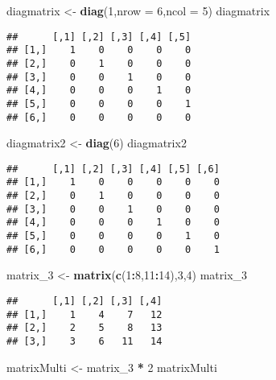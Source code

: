 \documentclass[
]{article}
\newenvironment{Shaded}{\begin{snugshade}}{\end{snugshade}}
\newcommand{\AttributeTok}[1]{\textcolor[rgb]{0.13,0.29,0.53}{#1}}
\newcommand{\DecValTok}[1]{\textcolor[rgb]{0.00,0.00,0.81}{#1}}
\newcommand{\FunctionTok}[1]{\textcolor[rgb]{0.13,0.29,0.53}{\textbf{#1}}}
\newcommand{\NormalTok}[1]{#1}
\newcommand{\OtherTok}[1]{\textcolor[rgb]{0.56,0.35,0.01}{#1}}
\newcommand{\SpecialCharTok}[1]{\textcolor[rgb]{0.81,0.36,0.00}{\textbf{#1}}}
\begin{document}
\begin{Shaded}
\begin{Highlighting}[]
\NormalTok{diagmatrix }\OtherTok{\textless{}{-}} \FunctionTok{diag}\NormalTok{(}\DecValTok{1}\NormalTok{,}\AttributeTok{nrow =} \DecValTok{6}\NormalTok{,}\AttributeTok{ncol =} \DecValTok{5}\NormalTok{)}
\NormalTok{diagmatrix}
\end{Highlighting}
\end{Shaded}

\begin{verbatim}
##      [,1] [,2] [,3] [,4] [,5]
## [1,]    1    0    0    0    0
## [2,]    0    1    0    0    0
## [3,]    0    0    1    0    0
## [4,]    0    0    0    1    0
## [5,]    0    0    0    0    1
## [6,]    0    0    0    0    0
\end{verbatim}

\begin{Shaded}
\begin{Highlighting}[]
\NormalTok{diagmatrix2 }\OtherTok{\textless{}{-}} \FunctionTok{diag}\NormalTok{(}\DecValTok{6}\NormalTok{)}
\NormalTok{diagmatrix2}
\end{Highlighting}
\end{Shaded}

\begin{verbatim}
##      [,1] [,2] [,3] [,4] [,5] [,6]
## [1,]    1    0    0    0    0    0
## [2,]    0    1    0    0    0    0
## [3,]    0    0    1    0    0    0
## [4,]    0    0    0    1    0    0
## [5,]    0    0    0    0    1    0
## [6,]    0    0    0    0    0    1
\end{verbatim}

\begin{Shaded}
\begin{Highlighting}[]
\NormalTok{matrix\_3 }\OtherTok{\textless{}{-}} \FunctionTok{matrix}\NormalTok{(}\FunctionTok{c}\NormalTok{(}\DecValTok{1}\SpecialCharTok{:}\DecValTok{8}\NormalTok{,}\DecValTok{11}\SpecialCharTok{:}\DecValTok{14}\NormalTok{),}\DecValTok{3}\NormalTok{,}\DecValTok{4}\NormalTok{)}
\NormalTok{matrix\_3}
\end{Highlighting}
\end{Shaded}

\begin{verbatim}
##      [,1] [,2] [,3] [,4]
## [1,]    1    4    7   12
## [2,]    2    5    8   13
## [3,]    3    6   11   14
\end{verbatim}

\begin{Shaded}
\begin{Highlighting}[]
\NormalTok{matrixMulti }\OtherTok{\textless{}{-}}\NormalTok{ matrix\_3 }\SpecialCharTok{*} \DecValTok{2}
\NormalTok{matrixMulti}
\end{Highlighting}
\end{Shaded}
\end{document}
